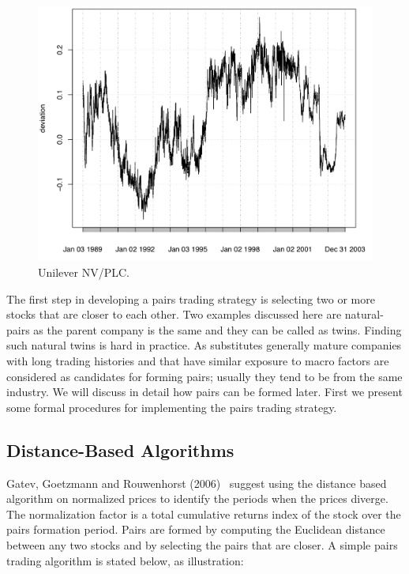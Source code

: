 	\begin{figure}[!ht]
	\centering
	\includegraphics[width=\textwidth]{chapters/chapter_stat_ts/figures/472.png}
	\caption{Unilever NV/PLC. \label{fig:3nvplc}}
	\end{figure}

The first step in developing a pairs trading strategy is selecting two or more stocks that are closer to each other. Two examples discussed here are natural-pairs as the parent company is the same and they can be called as twins. Finding such natural twins is hard in practice. As substitutes generally mature companies with long trading histories and that have similar exposure to macro factors are considered as candidates for forming pairs; usually they tend to be from the same industry. We will discuss in detail how pairs can be formed later. First we present some formal procedures for implementing the pairs trading strategy.



\subsection{Distance-Based Algorithms}


Gatev, Goetzmann and Rouwenhorst (2006)~\cite{ggr} suggest using the distance based algorithm on normalized prices to identify the periods when the prices diverge. The normalization factor is a total cumulative returns index of the stock over the pairs formation period. Pairs are formed by computing the Euclidean distance between any two stocks and by selecting the pairs that are closer. A simple pairs trading algorithm is stated below, as illustration: \twomedskip


